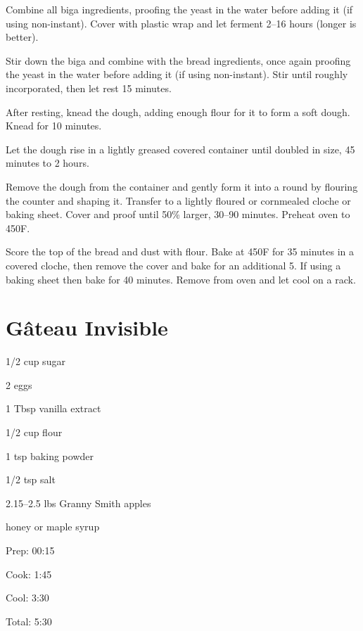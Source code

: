 \documentclass[oneside]{book}  %
\def\thisrecipe{}  %
\newcommand{\recipe}[1]{\section{#1}\def\thisrecipe{: #1}} %
\newcommand{\itemNL}{\item[] \hspace{-\labelsep}}  %
\newcommand{\degF}{\textdegree F\xspace}
\begin{document}
\begin{directions}
  \item Combine all biga ingredients, proofing the yeast in the water before
  adding it (if using non-instant). Cover with plastic wrap and let ferment
  2--16 hours (longer is better).

  \item Stir down the biga and combine with the bread ingredients, once again
  proofing the yeast in the water before adding it (if using non-instant). Stir
  until roughly incorporated, then let rest 15 minutes.

  \item After resting, knead the dough, adding enough flour for it to form a
  soft dough. Knead for 10 minutes.

  \item Let the dough rise in a lightly greased covered container until doubled
  in size, 45 minutes to 2 hours.

  \item Remove the dough from the container and gently form it into a round by
  flouring the counter and shaping it. Transfer to a lightly floured or
  cornmealed cloche or baking sheet. Cover and proof until 50\% larger, 30--90
  minutes. Preheat oven to 450\degF.

  \item Score the top of the bread and dust with flour. Bake at 450\degF for 35
  minutes in a covered cloche, then remove the cover and bake for an additional
  5. If using a baking sheet then bake for 40 minutes. Remove from oven and let
  cool on a rack.
\end{directions}
\recipe{G\^{a}teau Invisible} \label{recipe:gateau_invisible} %

\begin{IT}
  \begin{ingredients}
    \item[1/2 cup] sugar
    \item[2] eggs
    \item[1 Tbsp] vanilla extract
    \item[1/2 cup] flour
    \item[1 tsp] baking powder
    \item[1/2 tsp] salt
    \item[2.15--2.5 lbs] Granny Smith apples
    \itemNL honey or maple syrup
  \end{ingredients}

  \switchcolumn

  \begin{timeline}
    \item[Prep:]  00:15
    \item[Cook:]  1:45
    \item[Cool:]  3:30
    \item[Total:] 5:30
  \end{timeline}
\end{IT}
\end{document}
